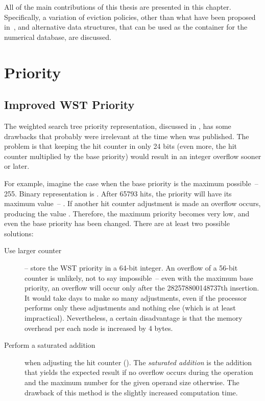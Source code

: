 All of the main contributions of this thesis are presented in this chapter. Specifically, a variation of eviction policies, other than what have been proposed in~\cite{park90}, and alternative data structures, that can be used as the container for the numerical database, are discussed.

\section{Priority}
\subsection{Improved WST Priority}
\label{sssec:improved_wst}
The weighted search tree priority representation, discussed in , has some drawbacks that probably were irrelevant at the time when \cite{park90} was published. The problem is that keeping the hit counter in only 24 bits (even more, the hit counter multiplied by the base priority) would result in an integer overflow sooner or later.

For example, imagine the case when the base priority is the maximum possible~-- 255. Binary representation is . After 65793 hits, the priority will have its maximum value~-- . If another hit counter adjustment is made an overflow occurs, producing the value . Therefore, the maximum priority becomes very low, and even the base priority has been changed.
There are at least two possible solutions:
\begin{description}
\item[Use larger counter]-- store the WST priority in a 64-bit integer. An overflow of a 56-bit counter is unlikely, not to say impossible~-- even with the maximum base priority, an overflow will occur only after the 282578800148737th insertion. It would take days to make so many adjustments, even if the processor performs only these adjustments and nothing else (which is at least impractical). Nevertheless, a certain disadvantage is that the memory overhead per each node is increased by 4 bytes.
\item[Perform a saturated addition] when adjusting the hit counter (). The \emph{saturated addition} is the addition that yields the expected result if no overflow occurs during the operation and the maximum number for the given operand size otherwise. The drawback of this method is the slightly increased computation time.
\end{description}

